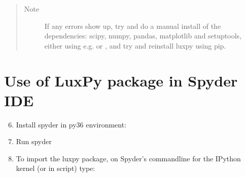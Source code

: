 \documentclass[letterpaper,10pt,english]{sphinxmanual}
\begin{document}
\begin{quote}\begin{description}
\item[{Note}] \leavevmode
If any errors show up, try and do a manual install of the dependencies:
scipy, numpy, pandas, matplotlib and setuptools,
either using e.g.
or
,
and try and reinstall luxpy using pip.

\end{description}\end{quote}


\section{Use of LuxPy package in Spyder IDE}
\label{\detokenize{installation:use-of-luxpy-package-in-spyder-ide}}\begin{enumerate}
\setcounter{enumi}{5}
\item {} 
Install spyder in py36 environment:
\begin{quote}

\end{quote}

\item {} 
Run spyder
\begin{quote}

\end{quote}

\item {} 
To import the luxpy package, on Spyder’s commandline for the IPython kernel (or in script) type:
\begin{quote}

\end{quote}

\end{enumerate}
\end{document}
